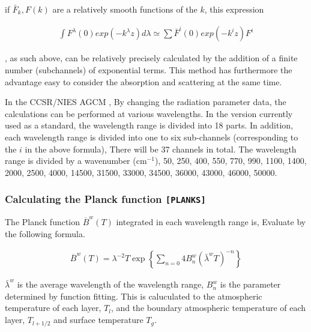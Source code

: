 if \(\bar{F}_k, F(k)\) are a relatively smooth functions of the \(k\), this expression

\begin{eqnarray}
 \int F^\lambda(0) exp (-k^\lambda z) d \lambda 
 \simeq \sum \bar{F}^i(0) exp (-k^i z) F^i
\end{eqnarray}

\begin{quote}
\protect\hypertarget{p-rad:beer-kd}{}{ }
\end{quote}

, as such above, can be relatively precisely calculated by the addition of a finite number (subchannels) of exponential terms. This method has furthermore the advantage  easy to consider the absorption and scattering at the same time.

In the CCSR/NIES AGCM , By changing the radiation parameter data, the
calculations can be performed at various wavelengths. In the version currently used
as a standard, the wavelength range is divided into 18 parts. In
addition, each wavelength range is divided into one to six sub-channels
(corresponding to the \(i\) in the above formula), There will be 37
channels in total. The wavelength range is divided by a wavenumber (cm\(^{-1}\)),
50, 250, 400, 550, 770, 990, 1100, 1400, 2000, 2500, 4000, 14500, 31500,
33000, 34500, 36000, 43000, 46000, 50000.

\hypertarget{calculating-the-planck-function-moduleplanks}{%
\subsubsection{\texorpdfstring{Calculating the Planck function
\texttt{{[}PLANKS{]}}}{Calculating the Planck function {[}PLANKS{]}}}\label{calculating-the-planck-function-moduleplanks}}

The Planck function \(\overline{B}^w(T)\) integrated in each wavelength
range is, Evaluate by the following formula.

\begin{eqnarray}
  \overline{B}^w(T) 
   = \lambda^{-2} T \exp \left\{ \sum_{n=0}{4} B^w_n (\bar{\lambda}^w T)^{-n}
                         \right\}
\end{eqnarray}

\(\bar{\lambda}^w\) is the average wavelength of the wavelength range,
\(B^w_n\) is the parameter determined by function fitting. This is caluculated to the
atmospheric temperature of each layer, \(T_l\), and the boundary
atmospheric temperature of each layer, \(T_{l+1/2}\) and surface
temperature \(T_g\).

